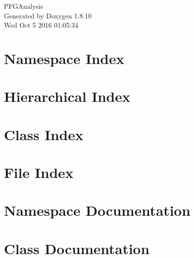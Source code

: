 \documentclass[twoside]{book}
\newcommand{\+}{\discretionary{\mbox{\scriptsize$\hookleftarrow$}}{}{}}
\newcommand{\clearemptydoublepage}{%
  \newpage{\pagestyle{empty}\cleardoublepage}%
}
\begin{document}
\hypersetup{pageanchor=false,
             bookmarks=true,
             bookmarksnumbered=true,
             pdfencoding=unicode
            }
\begin{titlepage}
\vspace*{7cm}
\begin{center}%
{\Large P\+F\+G\+Analysis }\\
\vspace*{1cm}
{\large Generated by Doxygen 1.8.10}\\
\vspace*{0.5cm}
{\small Wed Oct 5 2016 01:05:34}\\
\end{center}
\end{titlepage}
\clearemptydoublepage
\tableofcontents
\clearemptydoublepage
{}
\hypersetup{pageanchor=true}

\chapter{Namespace Index}

\chapter{Hierarchical Index}

\chapter{Class Index}

\chapter{File Index}

\chapter{Namespace Documentation}

\chapter{Class Documentation}






















\end{document}
